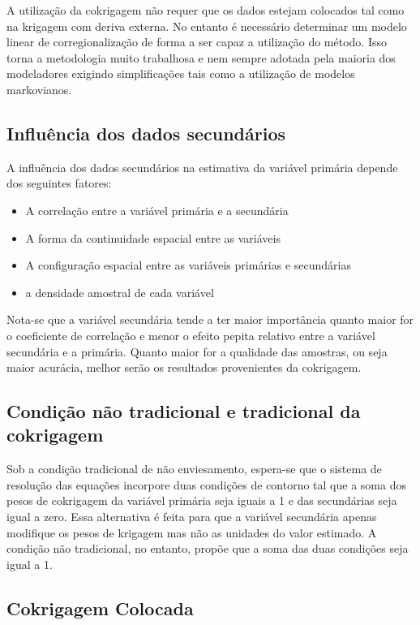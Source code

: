 A utilização da cokrigagem não requer que os dados estejam colocados tal como na krigagem com deriva externa. No entanto é necessário determinar um modelo linear de corregionalização de forma a ser capaz a utilização do método. Isso torna a metodologia muito trabalhosa e nem sempre adotada pela maioria dos modeladores exigindo simplificações tais como a utilização de modelos markovianos. 
  
 \subsection{Influência dos dados secundários}
 
A influência dos dados secundários na estimativa da variável primária depende dos seguintes fatores:

\begin{itemize}
	\item A correlação entre a variável primária e a secundária 
	\item A forma da continuidade espacial entre as variáveis 
	\item A configuração espacial entre as variáveis primárias e secundárias 
	\item a densidade amostral de cada variável 
\end{itemize} 

Nota-se que a variável secundária tende a ter maior importância quanto maior for o coeficiente de correlação e menor o efeito pepita relativo entre a variável secundária e a primária. Quanto maior for a qualidade das amostras, ou seja maior acurácia, melhor serão os resultados provenientes da cokrigagem. 

 \subsection{Condição não tradicional e tradicional da cokrigagem}
 
 Sob a condição tradicional de não enviesamento, espera-se que o sistema de resolução das equações incorpore duas condições de contorno tal que a soma dos pesos de cokrigagem da variável primária seja iguais a 1 e das secundárias seja igual a zero. Essa alternativa é feita para que a variável secundária apenas modifique os pesos de krigagem mas não as unidades do valor estimado. A condição não tradicional, no entanto, propõe que a soma das duas condições seja igual a 1. 
 
 \subsection{Cokrigagem Colocada}
 
